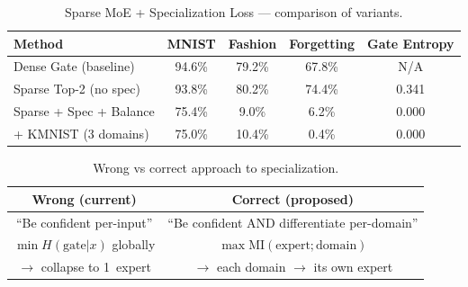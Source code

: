 \begin{table}[h]
\centering
\caption{Sparse MoE + Specialization Loss --- comparison of variants.}
\begin{tabular}{l c c c c}
\hline
\textbf{Method} & \textbf{MNIST} & \textbf{Fashion} & \textbf{Forgetting} & \textbf{Gate Entropy} \\
\hline
Dense Gate (baseline) & 94.6\% & 79.2\% & 67.8\% & N/A \\
Sparse Top-2 (no spec) & 93.8\% & 80.2\% & 74.4\% & 0.341 \\
Sparse + Spec + Balance & 75.4\% & 9.0\% & 6.2\% & 0.000 \\
+ KMNIST (3 domains) & 75.0\% & 10.4\% & 0.4\% & 0.000 \\
\hline
\end{tabular}
\end{table}

\begin{table}[h]
\centering
\caption{Wrong vs correct approach to specialization.}
\begin{tabular}{c c}
\hline
\textbf{Wrong (current)} & \textbf{Correct (proposed)} \\
\hline
``Be confident per-input'' & ``Be confident AND differentiate per-domain'' \\
$\min H(\text{gate}|x)$ globally & $\max \text{MI}(\text{expert};\text{domain})$ \\
$\to$ collapse to 1~expert & $\to$ each domain $\to$ its own expert \\
\hline
\end{tabular}
\end{table}
